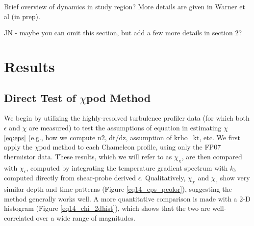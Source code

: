 \documentclass{ametsoc}
\begin{document}
Brief overview of dynamics in study region? More details are given in Warner et al (in prep).  

JN - maybe you can omit this section, but add a few more details in section 2?


\section{Results}

\subsection{Direct Test of $\chi$pod Method}


We begin by utilizing the highly-resolved turbulence profiler data (for which both $\epsilon$ and $\chi$ are measured) to test the assumptions of equation in estimating $\chi$ \ref{eq:eps} (e.g., how we compute n2, dt/dz, assumption of krho=kt, etc.  We first apply the $\chi$pod method to each Chameleon profile, using only the FP07 thermistor data. These results, which we will refer to as $\chi_{\chi}$, are then compared with $\chi_{\epsilon}$, computed by integrating the temperature gradient spectrum with $k_b$ computed directly from shear-probe derived $\epsilon$. Qualitatively, $\chi_{\chi}$ and $\chi_{\epsilon}$ show very similar depth and time patterns (Figure \ref{eq14_eps_pcolor}), suggesting the method generally works well. A more quantitative comparison is made with a 2-D histogram (Figure \ref{eq14_chi_2dhist}), which shows that the two are well-correlated over a wide range of magnitudes. 

%
%
%
%
%
\end{document}
